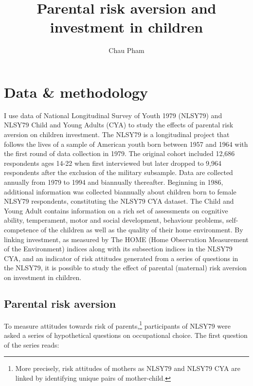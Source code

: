 \documentclass[]{article}
\title{Parental risk aversion and investment in children}
\author{Chau Pham}
\begin{document}
\maketitle
\onehalfspacing

\section{Data \& methodology}
I use data of National Longitudinal Survey of Youth 1979 (NLSY79) and NLSY79 Child and Young Adults (CYA) to study the effects of parental risk aversion on children investment. The NLSY79 is a longitudinal project that follows the lives of a sample of American youth born between 1957 and 1964 with the first round of data collection in 1979. The original cohort included 12,686 respondents ages 14-22 when first interviewed but later dropped to 9,964 respondents after the exclusion of the military subsample. Data are collected annually from 1979 to 1994 and biannually thereafter. Beginning in 1986, additional information was collected biannually about children born to female NLSY79 respondents, constituting the NLSY79 CYA dataset. The Child and Young Adult contains information on a rich set of assessments on cognitive ability, temperament, motor and social development, behaviour problems, self-competence of the children as well as the quality of their home environment. By linking investment, as measured by The HOME (Home Observation Measurement of the Environment) indices along with its subsection indices in the NLSY79 CYA, and an indicator of risk attitudes generated from a series of questions in the NLSY79, it is possible to study the effect of parental (maternal) risk aversion on investment in children.

\subsection{Parental risk aversion}
To measure attitudes towards risk of parents,\footnote{More precisely, risk attitudes of mothers as NLSY79 and NLSY79 CYA are linked by identifying unique pairs of mother-child.} participants of NLSY79 were asked a series of hypothetical questions on occupational choice. The first question of the series reads:
\end{document}
